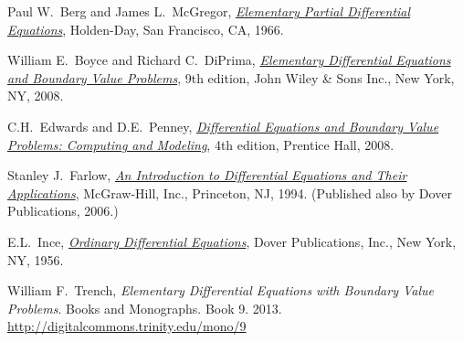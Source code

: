 \documentclass[12pt]{book}
\begin{document}

\addextraspacetotoc

\renewcommand{\bibname}{Further Reading}

\begin{thebibliography}{MM}


\label{furtherreading:chapter}

 Paul W.\ Berg and James L.\ McGregor, 
 \emph{\href{http://books.google.com/books?id=EfJQAAAAMAAJ}{Elementary
Partial Differential Equations}}, 
 Holden-Day,
 San Francisco, CA,
 1966.

 William E.\ Boyce and
 Richard C.\ DiPrima,
 \emph{\href{http://books.google.com/books?id=nYWcQgAACAAJ}{Elementary
Differential Equations and Boundary Value Problems}},
 9th edition,
 John Wiley \& Sons Inc.,
 New York, NY, 2008.

 C.H.\ Edwards and D.E.\ Penney,
 \emph{\href{http://books.google.com/books?id=qi6ePwAACAAJ}{Differential
Equations and Boundary Value Problems: Computing and Modeling}},
 4th edition,
 Prentice Hall,
 2008.

 Stanley J.\ Farlow,
 \emph{\href{http://books.google.com/books?id=_ozWAAAAMAAJ}{An Introduction
to Differential Equations and Their Applications}},
 McGraw-Hill, Inc.,
 Princeton, NJ,
 1994.  (Published also by Dover Publications, 2006.)

 E.L.\ Ince,
 \emph{\href{http://books.google.com/books?id=uYz-pqUD75gC}{Ordinary
Differential Equations}},
 Dover Publications, Inc.,
 New York, NY,
 1956.

 William F.\ Trench,
 \emph{Elementary Differential Equations with Boundary Value
Problems}. Books and Monographs. Book 9.  2013.
\url{http://digitalcommons.trinity.edu/mono/9}

\end{thebibliography}
\end{document}
